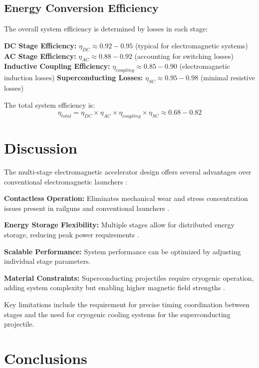 \documentclass[12pt,a4paper]{article}
\begin{document}
\subsection{Energy Conversion Efficiency}

The overall system efficiency is determined by losses in each stage:

\textbf{DC Stage Efficiency:} $\eta_{DC} \approx 0.92-0.95$ (typical for electromagnetic systems)
\textbf{AC Stage Efficiency:} $\eta_{AC} \approx 0.88-0.92$ (accounting for switching losses)  
\textbf{Inductive Coupling Efficiency:} $\eta_{coupling} \approx 0.85-0.90$ (electromagnetic induction losses)
\textbf{Superconducting Losses:} $\eta_{SC} \approx 0.95-0.98$ (minimal resistive losses)

The total system efficiency is:
\begin{equation}
\eta_{total} = \eta_{DC} \times \eta_{AC} \times \eta_{coupling} \times \eta_{SC} \approx 0.68-0.82
\end{equation}

\section{Discussion}

The multi-stage electromagnetic accelerator design offers several advantages over conventional electromagnetic launchers \cite{ref8}:

\textbf{Contactless Operation:} Eliminates mechanical wear and stress concentration issues present in railguns and conventional launchers \cite{ref1,ref2}.

\textbf{Energy Storage Flexibility:} Multiple stages allow for distributed energy storage, reducing peak power requirements \cite{ref5}.

\textbf{Scalable Performance:} System performance can be optimized by adjusting individual stage parameters.

\textbf{Material Constraints:} Superconducting projectiles require cryogenic operation, adding system complexity but enabling higher magnetic field strengths \cite{ref6,ref9}.

Key limitations include the requirement for precise timing coordination between stages and the need for cryogenic cooling systems for the superconducting projectile.

\section{Conclusions}
\end{document}
